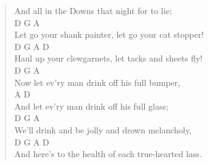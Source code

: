 \documentclass[11pt]{article}
\begin{document}
\begin{verse}
And all in the Downs that night for to lie;\\
\hspace*{4em}D                          G           A\\
Let go your shank painter, let go your cat stopper!\\
\hspace*{5em}D           G            A                D\\
Haul up your clewgarnets, let tacks and sheets fly!\\
\vspace*{1em}
\hspace*{4em}D                   G            A\\
Now let ev'ry man drink off his full bumper,\\
\hspace*{4em}A                                D\\
And let ev'ry man drink off his full glass;\\
\hspace*{6em}D                      G          A\\
We'll drink and be jolly and drown melancholy,\\
\hspace*{4em}D             G              A            D\\
And here's to the health of each true-hearted lass.\\
\end{verse}
\clearpage
\end{document}
